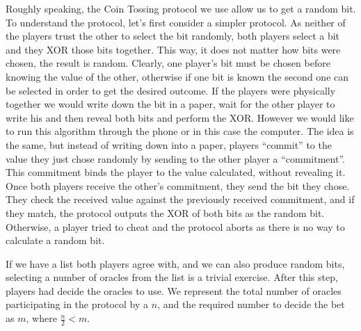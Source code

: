 Roughly speaking, the Coin Tossing protocol we use allow us to get a random bit.
To understand the protocol, let's first consider a simpler protocol.
As neither of the players trust the other to select the bit randomly, both
  players select a bit and they XOR those bits together.
This way, it does not matter how bits were chosen, the result is random.
Clearly, one player's bit must be chosen before knowing the value of  the other,
  otherwise if one bit is known the second one can be selected in order to get
  the desired outcome.
If the players were physically together we would write down the bit in a paper,
  wait for the other player to write his and then reveal both bits and perform
  the XOR\@.
However we would like to run this algorithm through the phone or in this case
  the computer.
The idea is the same, but instead of writing down into a paper, players
  ``commit'' to the value they just chose randomly by sending to the other
  player a ``commitment''.
This commitment binds the player to the value calculated, without revealing it.
Once both players receive the other's commitment, they send the bit they chose.
They check the received value against the previously received commitment, and if
  they match, the protocol outputs the XOR of both bits as the random bit.
Otherwise, a player tried to cheat and the protocol aborts as there is no way to
  calculate a random bit.

If we have a list both players agree with, and we can also produce random bits,
  selecting a number of oracles from the list is a trivial exercise.
After this step, players had decide the oracles to use.
We represent the total number of oracles participating in the protocol by a $n$,
  and the required number to decide the bet as $m$, where $\frac{n}{2} < m$.
